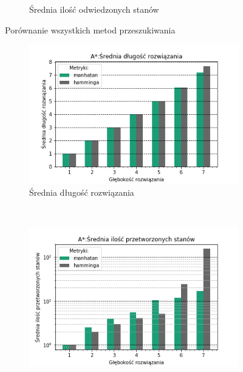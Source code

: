 \documentclass{classrep}
\begin{document}
\begin{figure}[H]
\begin{subfigure}[t]{0.45\textwidth}
        \caption{Średnia ilość odwiedzonych stanów}
        \label{ALL:visited}
    \end{subfigure}
    \caption{Porównanie wszystkich metod przeszukiwania}\label{fig:animals}
\end{figure}

\begin{figure}[H]
    \centering
    \begin{subfigure}[t]{0.45\textwidth}
        \includegraphics[width=\textwidth]{charts/ASTR_path_length.png}
        \caption{Średnia długość rozwiązania}
        \label{ASTR:path_length}
    \end{subfigure}
    ~ %
    \begin{subfigure}[t]{0.45\textwidth}
        \includegraphics[width=\textwidth]{charts/ASTR_processed.png}

\end{subfigure}
\end{figure}
\end{document}
